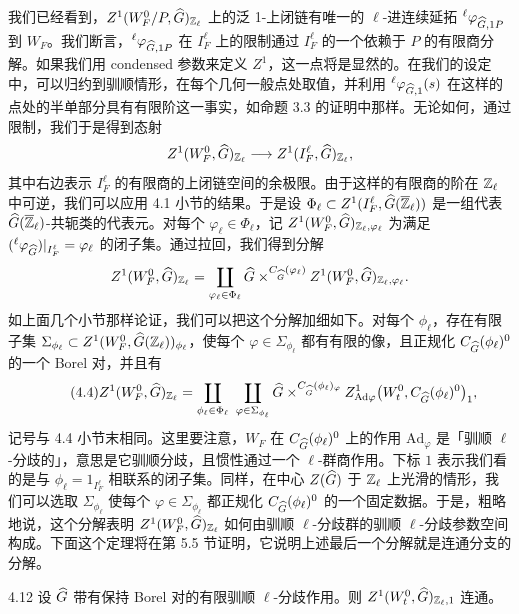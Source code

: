 我们已经看到，$Z^1(W^0_F/P,\widehat{G})_{\mathbb{Z}_\ell}$ 上的泛 1-上闭链有唯一的 $\ell$-进连续延拓 ${}^\ell\varphi_{\widehat{G},1P}$ 到 $W_F$。我们断言，${}^\ell\varphi_{\widehat{G},1P}$ 在 $I^\ell_F$ 上的限制通过 $I^\ell_F$ 的一个依赖于 $P$ 的有限商分解。如果我们用 condensed 参数来定义 $Z^1$，这一点将是显然的。在我们的设定中，可以归约到驯顺情形，在每个几何一般点处取值，并利用 ${}^\ell\varphi_{\widehat{G},1}(s)$ 在这样的点处的半单部分具有有限阶这一事实，如命题 3.3 的证明中那样。无论如何，通过限制，我们于是得到态射
\[
Z^1(W^0_F,\widehat{G})_{\mathbb{Z}_\ell}\longrightarrow Z^1(I^\ell_F,\widehat{G})_{\mathbb{Z}_\ell},
\]
其中右边表示 $I^\ell_F$ 的有限商的上闭链空间的余极限。由于这样的有限商的阶在 $\mathbb{Z}_\ell$ 中可逆，我们可以应用 4.1 小节的结果。于是设 $\Phi_\ell\subset Z^1(I^\ell_F,\widehat{G}(\overline{\mathbb{Z}}_\ell))$ 是一组代表 $\widehat{G}(\overline{\mathbb{Z}}_\ell)$-共轭类的代表元。对每个 $\varphi_\ell\in\Phi_\ell$，记 $Z^1(W^0_F,\widehat{G})_{\mathbb{Z}_\ell,\varphi_\ell}$ 为满足 $({}^\ell\varphi_{\widehat{G}})|_{I^\ell_F}=\varphi_\ell$ 的闭子集。通过拉回，我们得到分解
\[
Z^1(W^0_F,\widehat{G})_{\mathbb{Z}_\ell}=\coprod_{\varphi_\ell\in\Phi_\ell}
\widehat{G}\times^{C_{\widehat{G}}(\varphi_\ell)}Z^1(W^0_F,\widehat{G})_{\mathbb{Z}_\ell,\varphi_\ell}.
\]
如上面几个小节那样论证，我们可以把这个分解加细如下。对每个 $\phi_\ell$，存在有限子集 $\Sigma_{\phi_\ell}\subset Z^1(W^0_F,\widehat{G}(\mathbb{Z}_\ell))_{\phi_\ell}$，使每个 $\varphi\in\Sigma_{\phi_\ell}$ 都有有限的像，且正规化 $C_{\widehat{G}}(\phi_\ell)^0$ 的一个 Borel 对，并且有
\begin{equation*}\tag*{(4.4)}
Z^1(W^0_F,\widehat{G})_{\mathbb{Z}_\ell}
=\coprod_{\phi_\ell\in\Phi_\ell}\ \coprod_{\varphi\in\Sigma_{\phi_\ell}}
\widehat{G}\times^{C_{\widehat{G}}(\phi_\ell)_\varphi}
Z^1_{\mathrm{Ad}\varphi}\bigl(W^0_t,C_{\widehat{G}}(\phi_\ell)^0\bigr)_1,
\end{equation*}
记号与 4.4 小节末相同。这里要注意，$W_F$ 在 $C_{\widehat{G}}(\phi_\ell)^0$ 上的作用 $\mathrm{Ad}_\varphi$ 是「驯顺 $\ell$-分歧的」，意思是它驯顺分歧，且惯性通过一个 $\ell$-群商作用。下标 $1$ 表示我们看的是与 $\phi_\ell=1_{I^\ell_F}$ 相联系的闭子集。同样，在中心 $Z(\widehat{G})$ 于 $\mathbb{Z}_\ell$ 上光滑的情形，我们可以选取 $\Sigma_{\phi_\ell}$ 使每个 $\varphi\in\Sigma_{\phi_\ell}$ 都正规化 $C_{\widehat{G}}(\phi_\ell)^0$ 的一个固定数据。于是，粗略地说，这个分解表明 $Z^1(W^0_F,\widehat{G})_{\mathbb{Z}_\ell}$ 如何由驯顺 $\ell$-分歧群的驯顺 $\ell$-分歧参数空间构成。下面这个定理将在第 5.5 节证明，它说明上述最后一个分解就是连通分支的分解。

\begin{thm}{4.12}\label{thm:dat-4-12}
设 $\widehat{G}$ 带有保持 Borel 对的有限驯顺 $\ell$-分歧作用。则 $Z^1(W^0_t,\widehat{G})_{\mathbb{Z}_\ell,1}$ 连通。
\end{thm}

